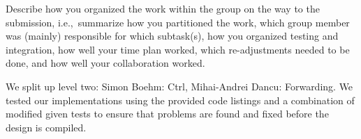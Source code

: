 Describe how you organized the work within the group on the way to the 
submission, i.e.,~summarize how you partitioned the work, which group 
member was (mainly) responsible for which subtask(s), how you organized 
testing and integration, how well your time plan worked, which 
re-adjustments needed to be done, and how well your collaboration 
worked.

	We split up level two: Simon Boehm: Ctrl, Mihai-Andrei Dancu: Forwarding.
We tested our implementations using the provided code listings and a combination of
modified given tests to ensure that problems are found and fixed before the design 
is compiled.
